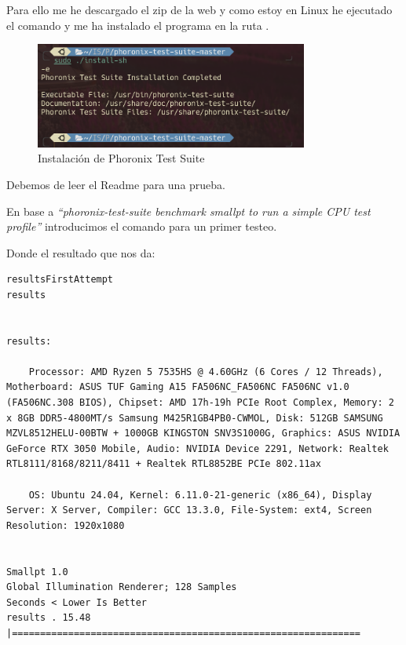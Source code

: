 Para ello me he descargado el zip de la web y como estoy en Linux he ejecutado el comando  y me ha instalado el programa en la ruta .
\begin{figure}[H]
    \centering
    \includegraphics[width=0.8\textwidth]{images/Bloque2/installPhoro.png}
    \caption{Instalación de Phoronix Test Suite}
    \label{fig:PTS}
\end{figure}

Debemos de leer el Readme para una prueba.

En base a \textit{``phoronix-test-suite benchmark smallpt to run a simple CPU test
profile''} introducimos el comando para un primer testeo. 

% 

Donde el resultado que nos da:

\begin{lstlisting}[style=customstyle]
    resultsFirstAttempt
results


results: 

	Processor: AMD Ryzen 5 7535HS @ 4.60GHz (6 Cores / 12 Threads), Motherboard: ASUS TUF Gaming A15 FA506NC_FA506NC FA506NC v1.0 (FA506NC.308 BIOS), Chipset: AMD 17h-19h PCIe Root Complex, Memory: 2 x 8GB DDR5-4800MT/s Samsung M425R1GB4PB0-CWMOL, Disk: 512GB SAMSUNG MZVL8512HELU-00BTW + 1000GB KINGSTON SNV3S1000G, Graphics: ASUS NVIDIA GeForce RTX 3050 Mobile, Audio: NVIDIA Device 2291, Network: Realtek RTL8111/8168/8211/8411 + Realtek RTL8852BE PCIe 802.11ax

	OS: Ubuntu 24.04, Kernel: 6.11.0-21-generic (x86_64), Display Server: X Server, Compiler: GCC 13.3.0, File-System: ext4, Screen Resolution: 1920x1080


Smallpt 1.0
Global Illumination Renderer; 128 Samples
Seconds < Lower Is Better
results . 15.48 |==============================================================

\end{lstlisting}

